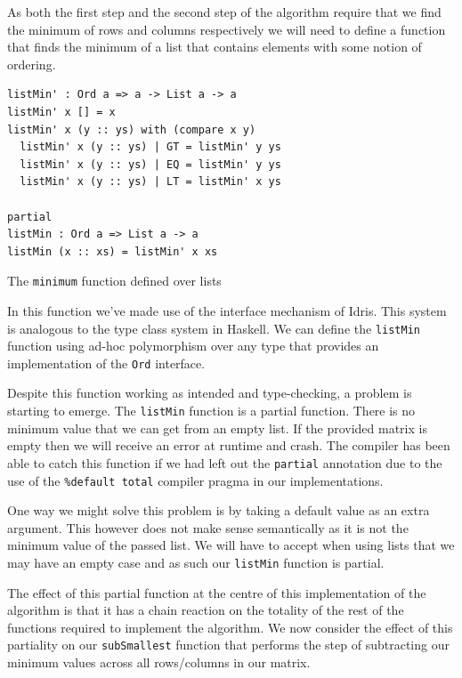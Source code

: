 \documentclass[a4paper, notitlepage]{report}
\begin{document}
As both the first step and the second step of the algorithm require that we find
the minimum of rows and columns respectively we will need to define a function
that finds the minimum of a list that contains elements with some notion of ordering.

\begin{listing}[H]
\begin{verbatim}
listMin' : Ord a => a -> List a -> a
listMin' x [] = x
listMin' x (y :: ys) with (compare x y)
  listMin' x (y :: ys) | GT = listMin' y ys
  listMin' x (y :: ys) | EQ = listMin' y ys
  listMin' x (y :: ys) | LT = listMin' x ys

partial
listMin : Ord a => List a -> a
listMin (x :: xs) = listMin' x xs
\end{verbatim}
\caption{The \texttt{minimum} function defined over lists}
\end{listing}

In this function we've made use of the interface mechanism of Idris. This system
is analogous to the type class system in Haskell. We can define the \texttt{listMin}
function using ad-hoc polymorphism over any type that provides an implementation
of the \texttt{Ord} interface.

Despite this function working as intended and type-checking, a problem is
starting to emerge. The \texttt{listMin} function is a partial function. There is no
minimum value that we can get from an empty list. If the provided matrix is
empty then we will receive an error at runtime and crash. The compiler has been
able to catch this function if we had left out the \texttt{partial} annotation due to the
use of the \texttt{\%default total} compiler pragma in our implementations.

One way we might solve this problem is by taking a default value as an extra
argument. This however does not make sense semantically as it is not the minimum
value of the passed list. We will have to accept when using lists that we may
have an empty case and as such our \texttt{listMin} function is partial.

The effect of this partial function at the centre of this implementation of the
algorithm is that it has a chain reaction on the totality of the rest of the
functions required to implement the algorithm. We now consider the effect of
this partiality on our \texttt{subSmallest} function that performs the step of
subtracting our minimum values across all rows/columns in our matrix.
\end{document}
